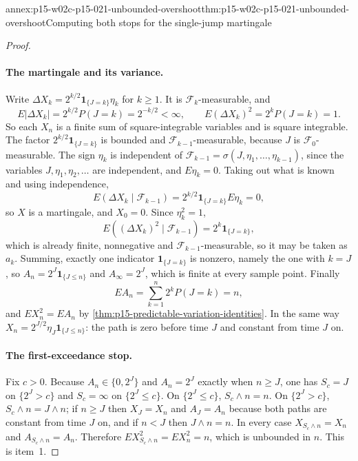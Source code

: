 \begin{annexitem}{annex:p15-w02c-p15-021-unbounded-overshoot}{thm:p15-w02c-p15-021-unbounded-overshoot}{Computing both stops for the single-jump martingale}
\begin{proof}
\paragraph{The martingale and its variance.}
Write \(\Delta X_k=2^{k/2}\mathbf1_{\{J=k\}}\eta_k\) for \(k\geq1\). It
is \(\mathcal F_k\)-measurable, and
\[
 E|\Delta X_k|=2^{k/2}P(J=k)=2^{-k/2}<\infty,\qquad
 E(\Delta X_k)^2=2^kP(J=k)=1 .
\]
So each \(X_n\) is a finite sum of square-integrable variables and is
square integrable. The factor \(2^{k/2}\mathbf1_{\{J=k\}}\) is bounded and
\(\mathcal F_{k-1}\)-measurable, because \(J\) is
\(\mathcal F_0\)-measurable. The sign \(\eta_k\) is independent of
\(\mathcal F_{k-1}=\sigma(J,\eta_1,\ldots,\eta_{k-1})\), since the
variables \(J,\eta_1,\eta_2,\ldots\) are independent, and
\(E\eta_k=0\). Taking out what is known and using independence,
\[
 E(\Delta X_k\mid\mathcal F_{k-1})
   =2^{k/2}\mathbf1_{\{J=k\}}E\eta_k=0,
\]
so \(X\) is a martingale, and \(X_0=0\). Since \(\eta_k^2=1\),
\[
 E((\Delta X_k)^2\mid\mathcal F_{k-1})=2^k\mathbf1_{\{J=k\}} ,
\]
which is already finite, nonnegative and \(\mathcal F_{k-1}\)-measurable,
so it may be taken as \(a_k\). Summing, exactly one indicator
\(\mathbf1_{\{J=k\}}\) is nonzero, namely the one with \(k=J\), so
\(A_n=2^J\mathbf1_{\{J\leq n\}}\) and \(A_\infty=2^J\), which is finite
at every sample point. Finally
\[
 EA_n=\sum_{k=1}^n2^kP(J=k)=n,
\]
and \(EX_n^2=EA_n\) by \cref{thm:p15-predictable-variation-identities}.
In the same way \(X_n=2^{J/2}\eta_J\mathbf1_{\{J\leq n\}}\): the path is
zero before time \(J\) and constant from time \(J\) on.

\paragraph{The first-exceedance stop.}
Fix \(c>0\). Because \(A_n\in\{0,2^J\}\) and \(A_n=2^J\) exactly when
\(n\geq J\), one has \(S_c=J\) on \(\{2^J>c\}\) and \(S_c=\infty\) on
\(\{2^J\leq c\}\). On \(\{2^J\leq c\}\), \(S_c\wedge n=n\). On
\(\{2^J>c\}\), \(S_c\wedge n=J\wedge n\); if \(n\geq J\) then
\(X_{J}=X_n\) and \(A_J=A_n\) because both paths are constant from
time \(J\) on, and if \(n<J\) then \(J\wedge n=n\). In every case
\(X_{S_c\wedge n}=X_n\) and \(A_{S_c\wedge n}=A_n\). Therefore
\(EX_{S_c\wedge n}^2=EX_n^2=n\), which is unbounded in \(n\). This is
item~1.


\end{proof}
\end{annexitem}

